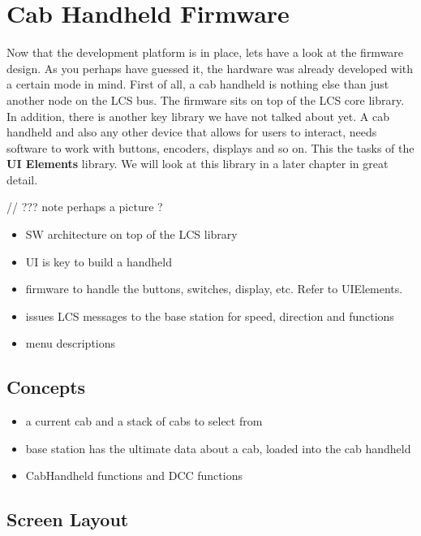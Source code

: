 \chapter{Cab Handheld Firmware}

Now that the development platform is in place, lets have a look at the firmware design. As you perhaps have guessed it, the hardware was already developed with a certain mode in mind. First of all, a cab handheld is nothing else than just another node on the LCS bus. The firmware sits on top of the LCS core library. In addition, there is another key library we have not talked about yet. A cab handheld and also any other device that allows for users to interact, needs software to work with buttons, encoders, displays and so on. This the tasks of the \textbf{UI Elements } library. We will look at this library in a later chapter in great detail.

// ??? note perhaps a picture ?
\begin{itemize}
\begin{itemize}
\item SW architecture on top of the LCS library
\item UI is key to build a handheld
\item firmware to handle the buttons, switches, display, etc. Refer to UIElements.
\item issues LCS messages to the base station for speed, direction and functions
\item menu descriptions
\end{itemize}
\end{itemize}

\section{Concepts}

\begin{itemize}
\begin{itemize}
\item a current cab and a stack of cabs to select from
\item base station has the ultimate data about a cab, loaded into the cab handheld
\item CabHandheld functions and DCC functions
\end{itemize}
\end{itemize}

\section{Screen Layout}

